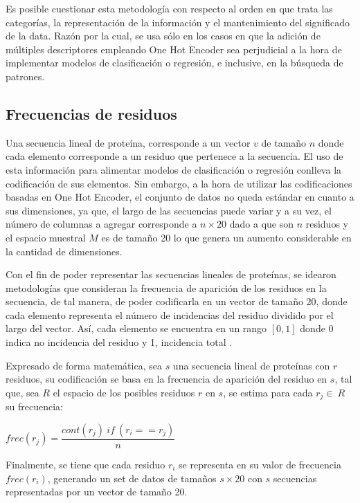 Es posible cuestionar esta metodología con respecto al orden en que trata las categorías, la representación de la información y el mantenimiento del significado de la data. Razón por la cual, se usa sólo en los casos en que la adición de múltiples descriptores empleando One Hot Encoder sea perjudicial a la hora de implementar modelos de clasificación o regresión, e inclusive, en la búsqueda de patrones.

\subsection{Frecuencias de residuos}

Una secuencia lineal de proteína, corresponde a un vector $v$ de tamaño $n$ donde cada elemento corresponde a un residuo que pertenece a la secuencia. El uso de esta información para alimentar modelos de clasificación o regresión conlleva la codificación de sus elementos. Sin embargo, a la hora de utilizar las codificaciones basadas en One Hot Encoder, el conjunto de datos no queda estándar en cuanto a sus dimensiones, ya que, el largo de las secuencias puede variar y a su vez, el número de columnas a agregar corresponde a $n \times 20$ dado a que son $n$ residuos y el espacio muestral $M$ es de tamaño 20 lo que genera un aumento considerable en la cantidad de dimensiones.

Con el fin de poder representar las secuencias lineales de proteínas, se idearon metodologías que consideran la frecuencia de aparición de los residuos en la secuencia, de tal manera, de poder codificarla en un vector de tamaño 20, donde cada elemento representa el número de incidencias del residuo dividido por el largo del vector. Así, cada elemento se encuentra en un rango $[0,1]$ donde 0 indica no incidencia del residuo y 1, incidencia total \cite{ozbudak2014protein}.

Expresado de forma matemática, sea $s$ una secuencia lineal de proteínas con $r$ residuos, su codificación se basa en la frecuencia de aparición del residuo en $s$, tal que, sea $R$ el espacio de los posibles residuos $r$ en $s$, se estima para cada $r_{j} \in\ R$ su frecuencia:

\begin{center}
	$frec(r_{j}) = \dfrac{cont(r_{j})\ if\  (r_{i}==r_{j})}{n}$
\end{center}

Finalmente, se tiene que cada residuo $r_{i}$ se representa en su valor de frecuencia $frec(r_{i})$, generando un set de datos de tamaños $s \times 20$ con $s$ secuencias representadas por un vector de tamaño 20.

